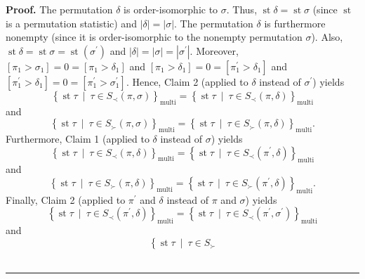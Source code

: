 \documentclass[numbers=enddot,12pt,final,onecolumn,notitlepage]{scrartcl}%
\theoremstyle{definition}
\newenvironment{proof}[1][Proof]{\noindent\textbf{#1.} }{\ \rule{0.5em}{0.5em}}
\begin{document}
\begin{proof}
The permutation $\delta$ is order-isomorphic to $\sigma$. Thus,
$\operatorname{st} \delta = \operatorname{st} \sigma$
(since $\operatorname{st}$ is a permutation statistic) and
$\left\vert \delta\right\vert =\left\vert \sigma\right\vert $. The permutation
$\delta$ is furthermore nonempty (since it is order-isomorphic to the nonempty
permutation $\sigma$). Also, $\operatorname{st} \delta
=\operatorname{st} \sigma   =\operatorname{st}\left(
\sigma^{\prime}\right)  $ and $\left\vert \delta\right\vert =\left\vert
\sigma\right\vert =\left\vert \sigma^{\prime}\right\vert $. Moreover, $\left[
\pi_{1}>\sigma_{1}\right]  =0=\left[  \pi_{1}>\delta_{1}\right]  $ and
$\left[  \pi_{1}>\delta_{1}\right]  =0=\left[  \pi_{1}^{\prime}>\delta
_{1}\right]  $ and $\left[  \pi_{1}^{\prime}>\delta_{1}\right]  =0=\left[
\pi_{1}^{\prime}>\sigma_{1}^{\prime}\right]  $. Hence, Claim 2 (applied to
$\delta$ instead of $\sigma^{\prime}$) yields%
\[
\left\{  \operatorname{st} \tau   \ \mid\ \tau\in S_{\prec
}\left(  \pi,\sigma\right)  \right\}  _{\operatorname*{multi}}=\left\{
\operatorname{st} \tau   \ \mid\ \tau\in S_{\prec}\left(
\pi,\delta\right)  \right\}  _{\operatorname*{multi}}%
\]
and%
\begin{equation}
\left\{  \operatorname{st} \tau   \ \mid\ \tau\in S_{\succ
}\left(  \pi,\sigma\right)  \right\}  _{\operatorname*{multi}}=\left\{
\operatorname{st} \tau   \ \mid\ \tau\in S_{\succ}\left(
\pi,\delta\right)  \right\}  _{\operatorname*{multi}}.\nonumber
\end{equation}
Furthermore, Claim 1 (applied to $\delta$ instead of $\sigma$) yields%
\[
\left\{  \operatorname{st} \tau   \ \mid\ \tau\in S_{\prec
}\left(  \pi,\delta\right)  \right\}  _{\operatorname*{multi}}=\left\{
\operatorname{st} \tau   \ \mid\ \tau\in S_{\prec}\left(
\pi^{\prime},\delta\right)  \right\}  _{\operatorname*{multi}}%
\]
and%
\[
\left\{  \operatorname{st} \tau   \ \mid\ \tau\in S_{\succ
}\left(  \pi,\delta\right)  \right\}  _{\operatorname*{multi}}=\left\{
\operatorname{st} \tau   \ \mid\ \tau\in S_{\succ}\left(
\pi^{\prime},\delta\right)  \right\}  _{\operatorname*{multi}}.
\]
Finally, Claim 2 (applied to $\pi^{\prime}$ and $\delta$ instead of $\pi$ and
$\sigma$) yields%
\[
\left\{  \operatorname{st} \tau   \ \mid\ \tau\in S_{\prec
}\left(  \pi^{\prime},\delta\right)  \right\}  _{\operatorname*{multi}%
}=\left\{  \operatorname{st} \tau   \ \mid\ \tau\in S_{\prec
}\left(  \pi^{\prime},\sigma^{\prime}\right)  \right\}
_{\operatorname*{multi}}%
\]
and%
\begin{equation}
\left\{  \operatorname{st} \tau   \ \mid\ \tau\in S_{\succ
}
\end{equation}
\end{proof}
\end{document}
